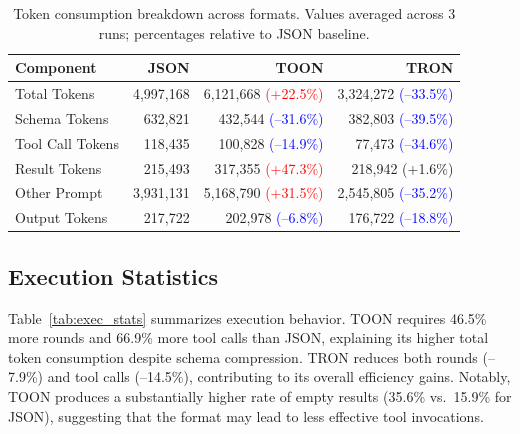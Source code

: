 \documentclass[10pt,twocolumn,letterpaper]{article}
\begin{document}
\begin{table}[ht]
    \centering
    \caption{Token consumption breakdown across formats. Values averaged across 3 runs; percentages relative to JSON baseline.}
    \label{tab:token_consumption}
    \footnotesize
    \begin{tabular}{@{}lrrr@{}}
        \toprule
        \textbf{Component} & \textbf{JSON} & \textbf{TOON} & \textbf{TRON} \\
        \midrule
        Total Tokens     & 4,997,168 & 6,121,668 {\scriptsize\textcolor{red}{(+22.5\%)}} & 3,324,272 {\scriptsize\textcolor{blue}{(--33.5\%)}} \\
        Schema Tokens    &   632,821 &   432,544 {\scriptsize\textcolor{blue}{(--31.6\%)}} &   382,803 {\scriptsize\textcolor{blue}{(--39.5\%)}} \\
        Tool Call Tokens &   118,435 &   100,828 {\scriptsize\textcolor{blue}{(--14.9\%)}} &    77,473 {\scriptsize\textcolor{blue}{(--34.6\%)}} \\
        Result Tokens    &   215,493 &   317,355 {\scriptsize\textcolor{red}{(+47.3\%)}} &   218,942 {\scriptsize (+1.6\%)} \\
        Other Prompt     & 3,931,131 & 5,168,790 {\scriptsize\textcolor{red}{(+31.5\%)}} & 2,545,805 {\scriptsize\textcolor{blue}{(--35.2\%)}} \\
        Output Tokens    &   217,722 &   202,978 {\scriptsize\textcolor{blue}{(--6.8\%)}} &   176,722 {\scriptsize\textcolor{blue}{(--18.8\%)}} \\
        \bottomrule
    \end{tabular}
\end{table}

\subsection{Execution Statistics}

Table~\ref{tab:exec_stats} summarizes execution behavior. TOON requires 46.5\% more rounds and 66.9\% more tool calls than JSON, explaining its higher total token consumption despite schema compression. TRON reduces both rounds (--7.9\%) and tool calls (--14.5\%), contributing to its overall efficiency gains. Notably, TOON produces a substantially higher rate of empty results (35.6\% vs.\ 15.9\% for JSON), suggesting that the format may lead to less effective tool invocations.
\end{document}
